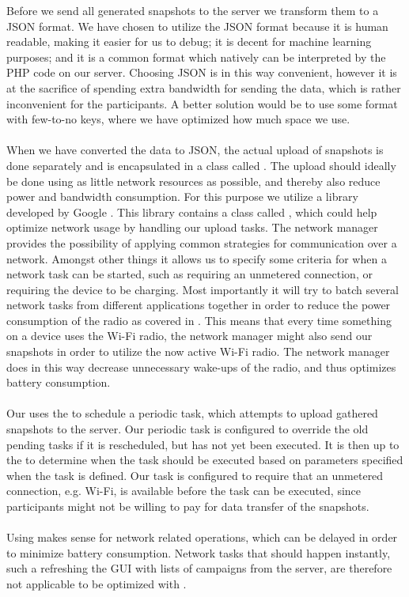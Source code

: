 Before we send all generated snapshots to the server we transform them to a JSON format. We have chosen to utilize the JSON format because it is human readable, making it easier for us to debug; it is decent for machine learning purposes; and it is a common format which natively can be interpreted by the PHP code on our server. Choosing JSON is in this way convenient, however it is at the sacrifice of spending extra bandwidth for sending the data, which is rather inconvenient for the participants. A better solution would be to use some format with few-to-no keys, where we have optimized how much space we use. 
\\\\
When we have converted the data to JSON, the actual upload of snapshots is done separately and is encapsulated in a class called . The upload should ideally be done using as little network resources as possible, and thereby also reduce power and bandwidth consumption. For this purpose we utilize a library developed by Google \parencite{gcmnetworkmanager}. This library contains a class called , which could help optimize network usage by handling our upload tasks. The network manager provides the possibility of applying common strategies for communication over a network. Amongst other things it allows us to specify some criteria for when a network task can be started, such as requiring an unmetered connection, or requiring the device to be charging. Most importantly it will try to batch several network tasks from different applications together in order to reduce the power consumption of the radio as covered in . This means that every time something on a device uses the Wi-Fi radio, the network manager might also send our snapshots in order to utilize the now active Wi-Fi radio. The network manager does in this way decrease unnecessary wake-ups of the radio, and thus optimizes battery consumption.
\\\\
Our  uses the  to schedule a periodic task, which attempts to upload gathered snapshots to the server. Our periodic task is configured to override the old pending tasks if it is rescheduled, but has not yet been executed. It is then up to the  to determine when the task should be executed based on parameters specified when the task is defined. Our task is configured to require that an unmetered connection, e.g. Wi-Fi, is available before the task can be executed, since participants might not be willing to pay for data transfer of the snapshots. 
\\\\
Using  makes sense for network related operations, which can be delayed in order to minimize battery consumption. Network tasks that should happen instantly, such a refreshing the GUI with lists of campaigns from the server, are therefore not applicable to be optimized with . 

